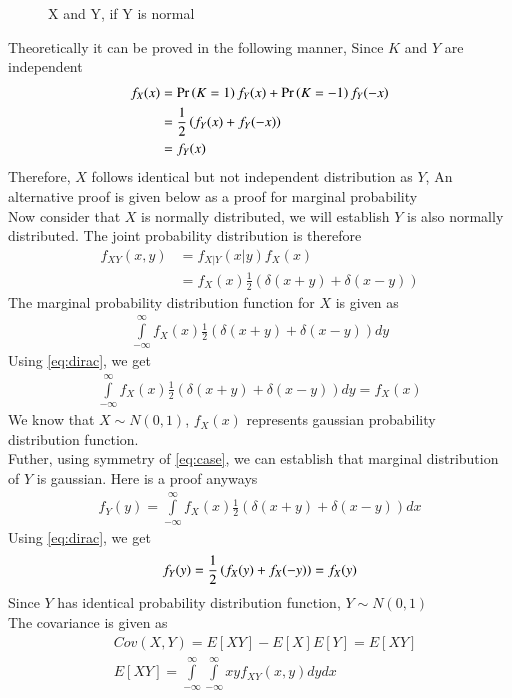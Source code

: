 \documentclass[journal,12pt,twocolumn]{IEEEtran}
\begin{document}
\begin{enumerate}
\begin{figure}[H]
\caption{X and Y, if Y is normal}
\label{plot}
\end{figure}
Theoretically it can be proved in the following manner,
Since $K$ and $Y$ are independent
\begin{align}
f_X(x)&=\Pr\left(K=1\right)f_Y(x)+\Pr\left(K=-1\right)f_Y(-x)\\
&=\frac{1}{2}\left(f_Y(x)+f_Y(-x)\right)\\
&=f_Y(x)
\end{align}
Therefore, $X$ follows identical but not independent distribution as $Y$, An alternative proof is given below as a proof for marginal probability\\
Now consider that $X$ is normally distributed, we will establish $Y$ is also normally distributed.
The joint probability distribution is therefore
\begin{align}
f_{XY}(x,y)&=f_{X|Y}(x|y)f_X(x)\nonumber \\
&=f_X(x)\frac{1}{2}(\delta(x+y)+\delta(x-y))\label{eq:counter}
\end{align}
The marginal probability distribution function for $X$ is given as
\begin{align}
\int\limits_{-\infty}^{\infty}f_X(x)\frac{1}{2}(\delta(x+y)+\delta(x-y)) dy
\end{align}
Using \eqref{eq:dirac}, we get
\begin{align}
\int\limits_{-\infty}^{\infty}f_X(x)\frac{1}{2}(\delta(x+y)+\delta(x-y))dy=f_X(x)
\end{align}
We know that $X\sim N(0,1)$, $f_X(x)$ represents gaussian probability distribution function.\\
Futher, using symmetry of \eqref{eq:case}, we can establish that marginal distribution of $Y$ is gaussian. Here is a proof anyways
\begin{align}
f_Y(y)=\int\limits_{-\infty}^{\infty}f_X(x)\frac{1}{2}(\delta(x+y)+\delta(x-y)) dx
\end{align}
Using \eqref{eq:dirac}, we get
\begin{align}
f_Y(y)=\frac{1}{2}\left(f_X(y)+f_X(-y)\right)=f_X(y)
\end{align}
Since $Y$ has identical probability distribution function, $Y\sim N(0,1)$\\
The covariance is given as
\begin{align}
&Cov(X,Y)=E[XY]-E[X]E[Y]=E[XY]\\
&E[XY]=\int\limits_{-\infty}^{\infty}\int\limits_{-\infty}^{\infty}xyf_{XY}(x,y) dy dx
\end{align}
\begin{align}

\end{align}
\end{enumerate}
\end{document}
